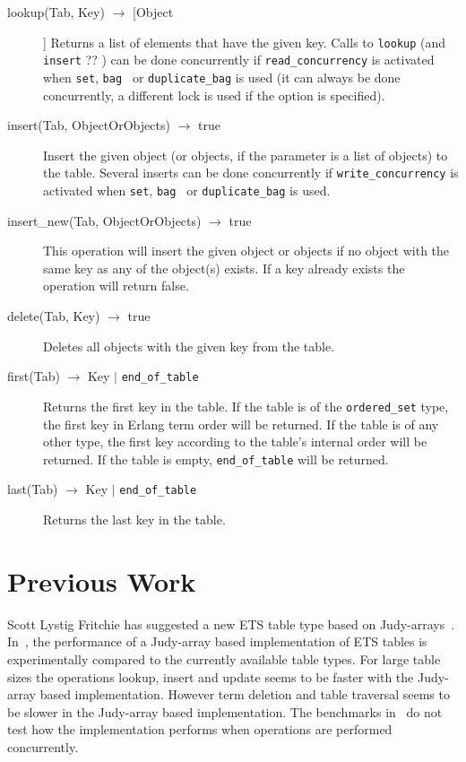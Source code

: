 \documentclass[aps,pre,preprint,nofootinbib]{revtex4}
\begin{document}
\begin{description}
 \item[lookup(Tab, Key) $\rightarrow$ [Object]] 
 Returns a list of elements that have the given key. 
 Calls to \verb|lookup| (and \verb|insert| ?? ) can be done concurrently if \verb|read_concurrency| is activated when \verb|set|, \verb|bag | or \verb|duplicate_bag| is used (it can always be done concurrently, a different lock is used if the option is specified).
 \item[insert(Tab, ObjectOrObjects) $\rightarrow$ true]
 Insert the given object (or objects, if the parameter is a list of objects) to the table.
 Several inserts can be done concurrently if \verb|write_concurrency| is activated when \verb|set|, \verb|bag | or \verb|duplicate_bag| is used.
 \item[insert\_new(Tab, ObjectOrObjects) $\rightarrow$ true]
 This operation will insert the given object or objects if no object with the same key as any of the object(s) exists. 
 If a key already exists the operation will return false.
 \item[delete(Tab, Key) $\rightarrow$ true] Deletes all objects with the given key from the table.
 \item[first(Tab) $\rightarrow$ Key $|$ \texttt{end\_of\_table} ] Returns the first key in the table. If the table is of the \verb|ordered_set| type, the first key in Erlang term order will be returned. If the table is of any other type, the first key according to the table's internal order will be returned. If the table is empty, \verb|end_of_table| will be returned.
 \item[last(Tab) $\rightarrow$ Key $|$ \texttt{end\_of\_table} ] Returns the last key in the table.
\end{description}

\section{Previous Work}

  Scott Lystig Fritchie has suggested a new ETS table type based on Judy-arrays~\cite{ScottEtsJudy}.
  In~\cite{ScottEtsJudy}, the performance of a Judy-array based implementation of ETS tables is experimentally compared to the currently available table types.
  For large table sizes the operations lookup, insert and update seems to be faster with the Judy-array based implementation.
  However term deletion and table traversal seems to be slower in the Judy-array based implementation.
  The benchmarks in~\cite{ScottEtsJudy} do not test how the implementation performs when operations are performed concurrently.
  
\end{document}
